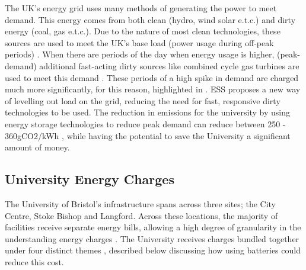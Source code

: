 The UK's energy grid uses many methods of generating the power to meet
demand. This energy comes from both clean (hydro, wind solar e.t.c.) and
dirty energy (coal, gas e.t.c.). Due to the nature of most clean
technologies, these sources are used to meet the UK's base load (power
usage during off-peak periods) \cite{GBNation22:online}. When there are
periods of the day when energy usage is higher, (peak- demand)
additional fast-acting dirty sources like combined cycle gas turbines
are used to meet this demand \cite{Reducing94:online}. These periods of
a high spike in demand are charged much more significantly, for this
reason, highlighted in \cite{7555793}. ESS proposes a new way of
levelling out load on the grid, reducing the need for fast, responsive
dirty technologies to be used. The reduction in emissions for the
university by using energy storage technologies to reduce peak demand
can reduce between 250 - 360gCO2/kWh \cite{Part1Att26:online}, while
having the potential to save the University a significant amount of
money.

\subsection{University Energy Charges}\label{university-energy-charges}

The University of Bristol's infrastructure spans across three sites; the
City Centre, Stoke Bishop and Langford. Across these locations, the
majority of facilities receive separate energy bills, allowing a high
degree of granularity in the understanding energy charges
\cite{Jbrentmeet}. The University receives charges bundled together
under four distinct themes \cite{Jbrentmeet}, described below discussing
how using batteries could reduce this cost.

